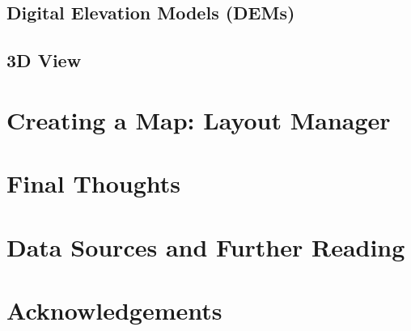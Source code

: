 \documentclass{article}
\begin{document}
\subsection{Digital Elevation Models (DEMs)}

\subsection{3D View}

\section{Creating a Map: Layout Manager}

\section{Final Thoughts}

\section{Data Sources and Further Reading}

\section{Acknowledgements}

\newpage
\printbibliography
\end{document}
